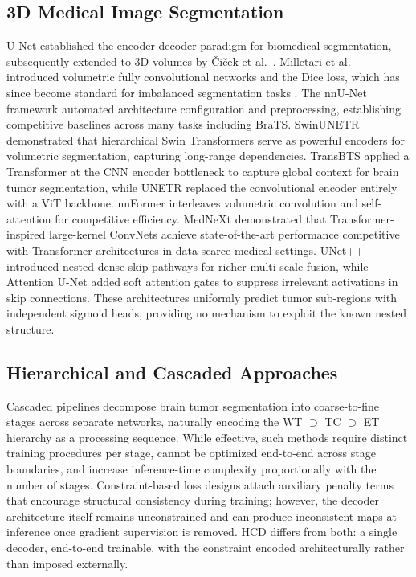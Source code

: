 \documentclass[conference]{IEEEtran}
\begin{document}
\subsection{3D Medical Image Segmentation}
U-Net \cite{ronneberger_unet} established the encoder-decoder paradigm
for biomedical segmentation, subsequently extended to 3D volumes by
\v{C}i\v{c}ek et al.~\cite{cciccek_3dunet}. Milletari et al.\
\cite{milletari_vnet} introduced volumetric fully convolutional
networks and the Dice loss, which has since become standard for
imbalanced segmentation tasks \cite{sudre_dice}. The nnU-Net framework
\cite{isensee_3dunet} automated architecture configuration and
preprocessing, establishing competitive baselines across many tasks
including BraTS. SwinUNETR \cite{swinunetr} demonstrated that
hierarchical Swin Transformers \cite{liu_swin} serve as powerful
encoders for volumetric segmentation, capturing long-range dependencies.
TransBTS \cite{transbts} applied a Transformer at the CNN encoder
bottleneck to capture global context for brain tumor segmentation, while
UNETR \cite{unetr} replaced the convolutional encoder entirely with a
ViT backbone.
nnFormer \cite{nnformer} interleaves volumetric convolution and
self-attention for competitive efficiency. MedNeXt \cite{mednext}
demonstrated that Transformer-inspired large-kernel ConvNets achieve
state-of-the-art performance competitive with Transformer architectures
in data-scarce medical settings. UNet++ \cite{unetpp} introduced
nested dense skip pathways for richer multi-scale fusion, while
Attention U-Net \cite{oktay_attunet} added soft attention gates to
suppress irrelevant activations in skip connections. These architectures uniformly predict tumor sub-regions
with independent sigmoid heads, providing no mechanism to exploit the
known nested structure.

\subsection{Hierarchical and Cascaded Approaches}
Cascaded pipelines \cite{cascade_brain} decompose brain tumor
segmentation into coarse-to-fine stages across separate networks,
naturally encoding the WT $\supset$ TC $\supset$ ET hierarchy as a
processing sequence. While effective, such methods require distinct
training procedures per stage, cannot be optimized end-to-end across
stage boundaries, and increase inference-time complexity proportionally
with the number of stages. Constraint-based loss designs
\cite{kervadec_constrained} attach auxiliary penalty terms that
encourage structural consistency during training; however, the decoder
architecture itself remains unconstrained and can produce inconsistent
maps at inference once gradient supervision is removed. HCD differs
from both: a single decoder, end-to-end trainable, with the constraint
encoded architecturally rather than imposed externally.
\end{document}
